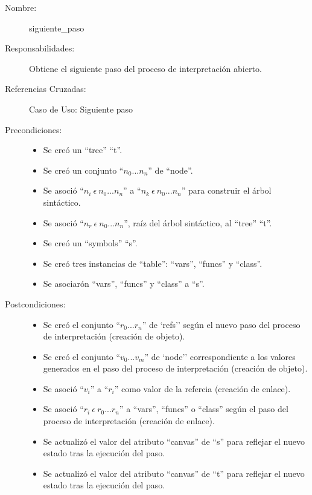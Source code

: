 	\begin{description}
		\item [Nombre:] siguiente\_paso
		\item [Responsabilidades:] Obtiene el siguiente paso del proceso de interpretación abierto.
		\item [Referencias Cruzadas: ] Caso de Uso: Siguiente paso
      \item [Precondiciones:] \hfill
         \begin {itemize}
         \item Se creó un ``tree'' ``t''.
         \item Se creó un conjunto ``$n_0...n_n$'' de ``node''.
         \item Se asoció ``$n_i\ \epsilon\ n_0...n_n$'' a ``$n_k\ \epsilon\ n_0...n_n$'' para construir el árbol sintáctico.
         \item Se asoció  ``$n_r\ \epsilon\ n_0...n_n$'', raíz del árbol sintáctico, al ``tree'' ``t''.
         \item Se creó un ``symbols'' ``s''.
         \item Se creó tres instancias de ``table'': ``vars'', ``funcs'' y ``class''.
         \item Se asociarón ``vars'', ``funcs'' y ``class'' a ``s''.
      \end{itemize}
      \item [Postcondiciones:] \hfill
      \begin {itemize}
         \item Se creó el conjunto ``$r_0...r_n$'' de `refs'' según el nuevo paso del proceso de interpretación (creación de objeto).
         \item Se creó el conjunto ``$v_0...v_m$'' de `node'' correspondiente a los valores generados en el paso del proceso de interpretación (creación de objeto).
         \item Se asoció ``$v_i$'' a ``$r_i$'' como valor de la refercia (creación de enlace).
         \item Se asoció ``$r_i\ \epsilon \ r_0...r_n$'' a ``vars'', ``funcs'' o ``class'' según el paso del proceso de interpretación (creación de enlace).  
         \item Se actualizó el valor del atributo ``canvas'' de ``s'' para reflejar el nuevo estado tras la ejecución del paso.
         \item Se actualizó el valor del atributo ``canvas'' de ``t'' para reflejar el nuevo estado tras la ejecución del paso.
      \end{itemize}
	\end{description}


